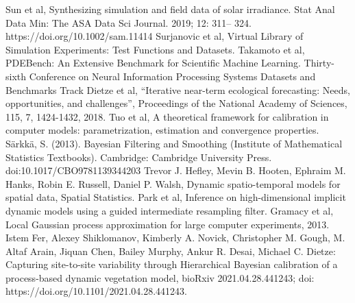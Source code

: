 \documentclass[12pt]{article}
\begin{document}
\begin{thebibliography}{20}
 Sun et al, Synthesizing simulation and field data of solar irradiance. Stat Anal Data Min: The ASA Data Sci Journal. 2019; 12: 311– 324. https://doi.org/10.1002/sam.11414
 Surjanovic et al, Virtual Library of Simulation Experiments: Test Functions and Datasets.
 Takamoto et al, PDEBench: An Extensive Benchmark for Scientific Machine Learning. Thirty-sixth Conference on Neural Information Processing Systems Datasets and Benchmarks Track
 Dietze et al, “Iterative near-term ecological forecasting: Needs, opportunities, and challenges”, Proceedings of the National Academy of Sciences, 115, 7, 1424-1432, 2018.
 Tuo et al, A theoretical framework for calibration in computer models: parametrization, estimation and convergence properties. 
 Särkkä, S. (2013). Bayesian Filtering and Smoothing (Institute of Mathematical Statistics Textbooks). Cambridge: Cambridge University Press. doi:10.1017/CBO9781139344203
 Trevor J. Hefley, Mevin B. Hooten, Ephraim M. Hanks, Robin E. Russell, Daniel P. Walsh, Dynamic spatio-temporal models for spatial data, Spatial Statistics.
 Park et al, Inference on high-dimensional implicit dynamic models using a guided intermediate resampling filter.
 Gramacy et al, Local Gaussian process approximation for large computer experiments, 2013.
 Istem Fer, Alexey Shiklomanov, Kimberly A. Novick, Christopher M. Gough, M. Altaf Arain, Jiquan Chen, Bailey Murphy, Ankur R. Desai, Michael C. Dietze: Capturing site-to-site variability through Hierarchical Bayesian calibration of a process-based dynamic vegetation model, bioRxiv 2021.04.28.441243; doi: https://doi.org/10.1101/2021.04.28.441243. 

\end{thebibliography}
\end{document}
